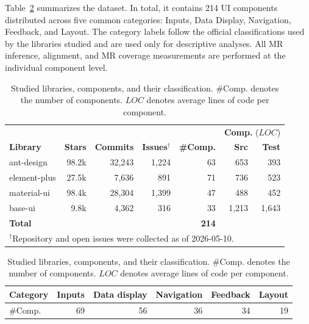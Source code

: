 Table~\ref{tab:dataset} summarizes the dataset. In total, it contains 214 UI components distributed across five common categories: Inputs, Data Display, Navigation, Feedback, and Layout. The category labels follow the official classifications used by the libraries studied and are used only for descriptive analyses. All MR inference, alignment, and MR coverage measurements are performed at the individual component level.

\begin{table}[h]
\centering
\caption{Studied libraries, components, and their classification. \#Comp. denotes the number of components. $LOC$ denotes average lines of code per component.}
\label{tab:dataset}
\small
\setlength{\tabcolsep}{2pt}
\begin{tabular}{lrrrrrr}
\toprule
&  & & \textbf{ } & & \multicolumn{2}{c}{\textbf{Comp.} ($LOC$)} \\
\textbf{Library} & \textbf{Stars} & \textbf{Commits} &  \textbf{Issues$^\dagger$} & \textbf{\#Comp.} &  \textbf{Src} & \textbf{Test}  \\
\midrule
ant-design\footnotemark[1]   & 98.2k & 32{,}243 & 1{,}224 & 63 & 653   & 393  \\
element-plus\footnotemark[2] & 27.5k &  7{,}636 &   891   & 71 & 736   & 523  \\
material-ui\footnotemark[3] & 98.4k & 28{,}304 & 1{,}399 & 47 & 488   & 452  \\
base-ui\footnotemark[4]  &  9.8k &  4{,}362 &   316   & 33 & 1{,}213 & 1{,}643 \\
\midrule
\textbf{Total} & & & & \textbf{214}  & & \\
\bottomrule
\multicolumn{7}{l}{\footnotesize $^\dagger$Repository and open issues were collected as of 2026-05-10.}
\end{tabular}
\vspace{6pt}

\begin{tabular}{@{}lrrrrr@{}}
\toprule
\textbf{Category} & \textbf{Inputs} & \textbf{Data display} & \textbf{Navigation} & \textbf{Feedback} & \textbf{Layout} \\
\midrule
\#Comp.   & 69 & 56 & 36 & 34 & 19 \\
\bottomrule
\end{tabular}
\end{table}


